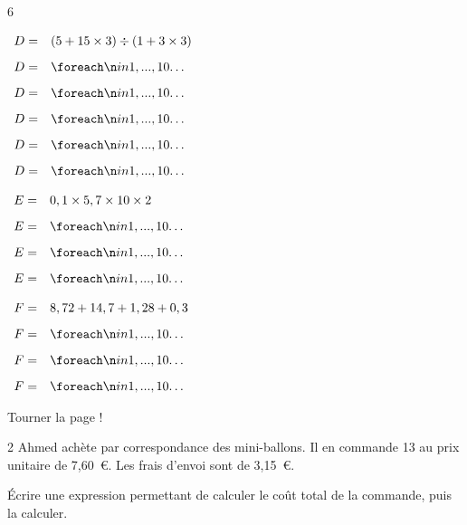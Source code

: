 \documentclass[a4paper]{book}
\begin{document}
{\begin{exerciceNote}{6}
\begin{minipage}{0.35\linewidth}
            \bigskip

            $\begin{array}{ll}
                D = & (5+15\times3)\div(1+3\times3) \\[2ex]
                D = & \points[10]\\[2ex]
                D = & \points[10]\\[2ex]
                D = & \points[10]\\[2ex]
                D = & \points[10]\\[2ex]
                D = & \points[10]
            \end{array}$
        \end{minipage}
        \vline
        \begin{minipage}{0.3\linewidth}
            $\begin{array}{ll}
                E = & 0,1\times 5,7 \times 10 \times 2 \\[2ex]
                E = & \points[10]\\[2ex]
                E = & \points[10]\\[2ex]
                E = & \points[10]
            \end{array}$

            \bigskip

            $\begin{array}{ll}
                F = & 8,72 + 14,7 + 1,28 + 0,3 \\[2ex]
                F = & \points[10]\\[2ex]
                F = & \points[10]\\[2ex]
                F = & \points[10]
            \end{array}$
        \end{minipage}
    \end{exerciceNote}

    \vfill
    \hfill Tourner la page !


\newpage


    \begin{exerciceNote}{2}
        Ahmed achète par correspondance des mini-ballons. Il en commande 13 au prix unitaire de 7,60~\euro. Les frais d'envoi sont de 3,15~\euro.
        
        Écrire une expression permettant de calculer le coût total de la commande, puis la calculer. 

        \points[128]     
    \end{exerciceNote}


}
\end{document}
